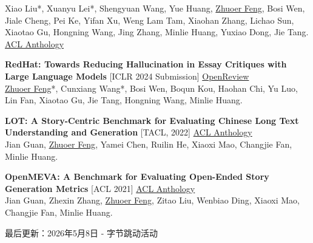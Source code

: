 \documentclass[11pt, a4paper]{article}
\begin{document}
\begin{enumerate}[leftmargin=1.5em, topsep=2pt, itemsep=0pt, parsep=0pt, label={[\arabic*]}]
    {\small Xiao Liu*, Xuanyu Lei*, Shengyuan Wang, Yue Huang, \underline{Zhuoer Feng}, Bosi Wen, Jiale Cheng, Pei Ke, Yifan Xu, Weng Lam Tam, Xiaohan Zhang, Lichao Sun, Xiaotao Gu, Hongning Wang, Jing Zhang, Minlie Huang, Yuxiao Dong, Jie Tang.} {\small \href{https://aclanthology.org/2024.acl-long.624/}{ACL Anthology}} 
    \item \textbf{RedHat: Towards Reducing Hallucination in Essay Critiques with Large Language Models} \textcolor{accent}{[ICLR 2024 Submission]} {\small \href{https://openreview.net/forum?id=IULlNTZZel}{OpenReview}} \\
    {\small \underline{Zhuoer Feng}*, Cunxiang Wang*, Bosi Wen, Boqun Kou, Haohan Chi, Yu Luo, Lin Fan, Xiaotao Gu, Jie Tang, Hongning Wang, Minlie Huang.} 
    \item \textbf{LOT: A Story-Centric Benchmark for Evaluating Chinese Long Text Understanding and Generation} \textcolor{accent}{[TACL, 2022]} {\small \href{https://aclanthology.org/2022.tacl-1.25.pdf}{ACL Anthology}} \\
    {\small Jian Guan, \underline{Zhuoer Feng}, Yamei Chen, Ruilin He, Xiaoxi Mao, Changjie Fan, Minlie Huang.} 
    \item \textbf{OpenMEVA: A Benchmark for Evaluating Open-Ended Story Generation Metrics} \textcolor{accent}{[ACL 2021]} {\small \href{https://aclanthology.org/2021.acl-long.500.pdf}{ACL Anthology}} \\
    {\small Jian Guan, Zhexin Zhang, \underline{Zhuoer Feng}, Zitao Liu, Wenbiao Ding, Xiaoxi Mao, Changjie Fan, Minlie Huang.} 
\end{enumerate}

\vspace{-0.8em}

\begin{center}
    {\small\color{lightgray} 最后更新：2026年5月8日 - 字节跳动活动}
\end{center}
\end{document}
